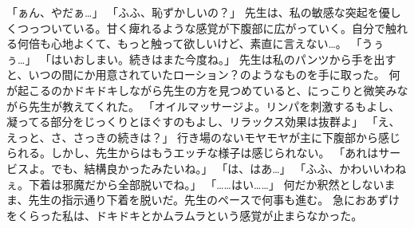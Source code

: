 「ぁん、やだぁ…」
「ふふ、恥ずかしいの？」
先生は、私の敏感な突起を優しくつっついている。甘く痺れるような感覚が下腹部に広がっていく。自分で触れる何倍も心地よくて、もっと触って欲しいけど、素直に言えない…。
「うぅぅ…」
「はいおしまい。続きはまた今度ね。」
先生は私のパンツから手を出すと、いつの間にか用意されていたローション？のようなものを手に取った。
何が起こるのかドキドキしながら先生の方を見つめていると、にっこりと微笑みながら先生が教えてくれた。
「オイルマッサージよ。リンパを刺激するもよし、凝ってる部分をじっくりとほぐすのもよし、リラックス効果は抜群よ」
「え、えっと、さ、さっきの続きは？」
行き場のないモヤモヤが主に下腹部から感じられる。しかし、先生からはもうエッチな様子は感じられない。
「あれはサービスよ。でも、結構良かったみたいね。」
「は、はあ…」
「ふふ、かわいいわねぇ。下着は邪魔だから全部脱いでね。」
「……はい……」
何だか釈然としないまま、先生の指示通り下着を脱いだ。先生のペースで何事も進む。
急におあずけをくらった私は、ドキドキとかムラムラという感覚が止まらなかった。


